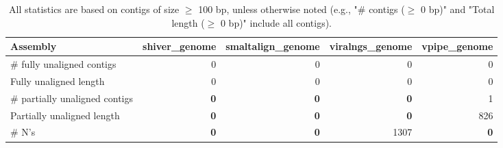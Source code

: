 \documentclass[12pt,a4paper]{article}
\begin{document}
\begin{table}[ht]
\begin{center}
\caption{All statistics are based on contigs of size $\geq$ 100 bp, unless otherwise noted (e.g., "\# contigs ($\geq$ 0 bp)" and "Total length ($\geq$ 0 bp)" include all contigs).}
\begin{tabular}{|l*{4}{|r}|}
\hline
Assembly & shiver\_genome & smaltalign\_genome & viralngs\_genome & vpipe\_genome \\ \hline
\# fully unaligned contigs & 0 & 0 & 0 & 0 \\ \hline
Fully unaligned length & 0 & 0 & 0 & 0 \\ \hline
\# partially unaligned contigs & {\bf 0} & {\bf 0} & {\bf 0} & 1 \\ \hline
Partially unaligned length & {\bf 0} & {\bf 0} & {\bf 0} & 826 \\ \hline
\# N's & {\bf 0} & {\bf 0} & 1307 & {\bf 0} \\ \hline
\end{tabular}
\end{center}
\end{table}
\end{document}
